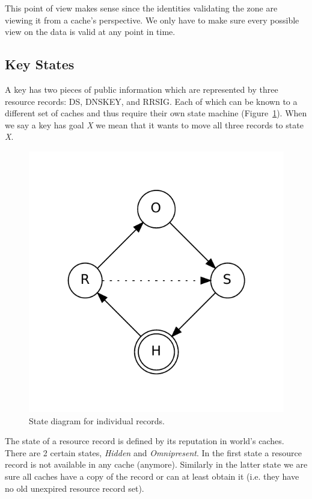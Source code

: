 \documentclass[twoside,english, a4paper]{article}
\begin{document}
This point of view makes sense since the identities validating the 
zone are viewing it from a cache's perspective. We only have to make 
sure every
possible view on the data is valid at any point in time.

\subsection{Key States} \label{sec:keystates}

A key has two pieces of public information which are 
represented by three resource records: DS, DNSKEY, and RRSIG. Each of 
which can be known to a different set of caches and thus require their
own state machine (Figure~\ref{fig:states}). When we say a key has 
goal \emph{X} we mean that it wants to move all three records to state
\emph{X}.

\begin{figure}[h]
	\centering
	\includegraphics[scale=0.5]{states.pdf}
	\caption{State diagram for individual records.}
	\label{fig:states}
\end{figure}

The state of a resource record is defined by its reputation in 
world's caches. There are 2 certain states, \emph{Hidden} and \emph
{Omnipresent}. In the first state a resource record is not available 
in any cache (anymore). Similarly in the latter state we are sure 
all caches have a copy of the record or can at least obtain it (i.e. 
they have no old unexpired resource record set).
\end{document}
